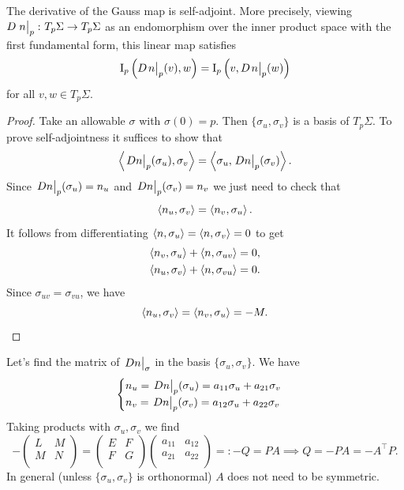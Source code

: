 \documentclass[a4paper,11pt]{article}
\begin{document}
\begin{lemma}
	The derivative of the Gauss map is self-adjoint.
	More precisely, viewing \( D \eval{n}_p \colon T_p \Sigma \to T_p \Sigma \) as an endomorphism over the inner product space with the first fundamental form, this linear map satisfies
	\[
		\Iff_p\qty(D \teval{n}{p}(v), w) = \Iff_p\qty(v, D \teval{n}{p}(w))
	\]
	for all \( v, w \in T_p \Sigma \).
\end{lemma}

\begin{proof}
	Take an allowable $\sigma$ with $\sigma(0)=p$. Then $ \{\sigma_u,\sigma_v\} $ is a basis of $ T_p\Sigma $. To prove self-adjointness it suffices to show that 
	\[
		\inner{\teval{Dn}p(\sigma_u),\sigma_v} = \inner{\sigma_u,\teval{Dn}p (\sigma_v)}. 
	\]
	Since $ \teval{Dn}p(\sigma_u) = n_u $ and $ \teval{Dn}p (\sigma_v) = n_v $ we just need to check that
	\[
		\left\langle{n_u,\sigma_v}\right\rangle = \left\langle{n_v,\sigma_u}\right\rangle. 
	\]
	It follows from differentiating $ \left\langle{n,\sigma_u}\right\rangle = \left\langle{n,\sigma_v}\right\rangle = 0 $ to get 
	\begin{align*}
		\left\langle{n_v,\sigma_u}\right\rangle + \left\langle{n,\sigma_{uv}}\right\rangle = 0,\\ 
		\left\langle{n_u,\sigma_v}\right\rangle + \left\langle{n,\sigma_{vu}}\right\rangle = 0.
	\end{align*}
	Since $ \sigma_{uv} = \sigma_{vu} $, we have 
	\[
		\left\langle{n_u,\sigma_v}\right\rangle=\left\langle{n_v,\sigma_u}\right\rangle=-M. \qedhere
	\]
\end{proof}

Let's find the matrix of $ \teval{Dn}{\sigma} $ in the basis $ \{\sigma_u,\sigma_v\} $. We have 
\[
	\begin{cases}
	n_u = \teval{D n}{p} (\sigma_u) = a_{11} \sigma_u + a_{21} \sigma_v\\ 
	n_v = \teval{D n}p(\sigma_v) = a_{12} \sigma_u + a_{22} \sigma_v
	\end{cases} 
\]
Taking products with $ \sigma_u, \sigma_v $ we find 
\[
	- \begin{pmatrix}
		L  &  M \\
		M &  N \\
	\end{pmatrix} = \begin{pmatrix}
		E &  F \\
		F &  G \\
	\end{pmatrix} \begin{pmatrix}
		a_{11} &  a_{12} \\
		a_{21} &  a_{22} \\
	\end{pmatrix} =: -Q = PA \implies Q = -PA = -A ^\top P. 
\]
In general (unless $ \{\sigma_u,\sigma_v\} $ is orthonormal) $A$ does not need to be symmetric.
\end{document}
